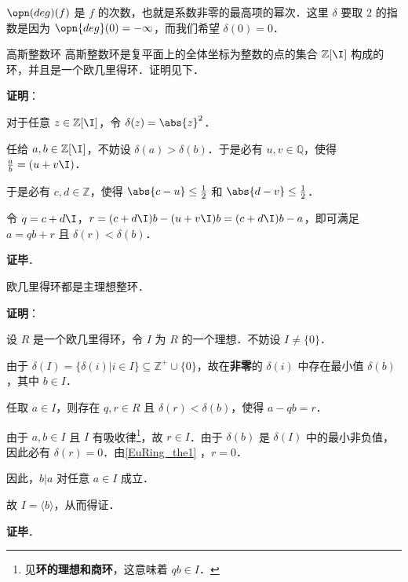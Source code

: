 $\opn(deg)(f)$ 是 $f$ 的次数，也就是系数非零的最高项的幂次．这里 $\delta$ 要取 $2$ 的指数是因为 $\opn{deg}(0)=-\infty$，而我们希望 $\delta(0)=0$．

\begin{example}{高斯整数环}
高斯整数环是复平面上的全体坐标为整数的点的集合 $\mathbb{Z}[\I]$ 构成的环，并且是一个欧几里得环．证明见下．
\end{example}

\textbf{证明}：

对于任意 $z\in\mathbb{Z}[\I]$，令 $\delta(z)=\abs{z}^2$．

任给 $a, b\in\mathbb{Z}[\I]$，不妨设 $\delta(a)>\delta(b)$．于是必有 $u, v\in\mathbb{Q}$，使得 $\frac{a}{b}=(u+v\I)$．

于是必有 $c, d\in\mathbb{Z}$，使得 $\abs{c-u}\leq\frac{1}{2}$ 和 $\abs{d-v}\leq\frac{1}{2}$．

令 $q=c+d\I$，$r=(c+d\I)b-(u+v\I)b=(c+d\I)b-a$，即可满足 $a=qb+r$ 且 $\delta(r)<\delta(b)$．

\textbf{证毕}．

\begin{theorem}{}
欧几里得环都是主理想整环．
\end{theorem}

\textbf{证明}：

设 $R$ 是一个欧几里得环，令 $I$ 为 $R$ 的一个理想．不妨设 $I\not=\{0\}$．

由于 $\delta(I)=\{\delta(i)|i\in I\}\subseteq\mathbb{Z}^+\cup\{0\}$，故在\textbf{非零}的 $\delta(i)$ 中存在最小值 $\delta(b)$，其中 $b\in I$．

任取 $a\in I$，则存在 $q, r\in R$ 且 $\delta(r)<\delta(b)$，使得 $a-qb=r$．

由于 $a, b\in I$ 且 $I$ 有吸收律\footnote{见\textbf{环的理想和商环}，这意味着 $qb\in I$．}，故 $r\in I$．由于 $\delta(b)$ 是 $\delta(I)$ 中的最小非负值，因此必有 $\delta(r)=0$．由\autoref{EuRing_the1} ，$r=0$．

因此，$b|a$ 对任意 $a\in I$ 成立．

故 $I=\langle b \rangle$，从而得证．

\textbf{证毕}．



